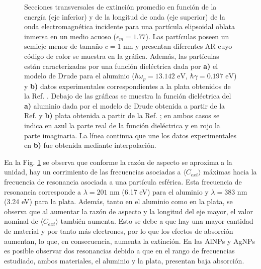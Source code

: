 \begin{figure}[h!]
	\quad%
	\caption{Secciones transversales de extinción promedio en función de la energía (eje inferior) y de la longitud de onda (eje superior) de la onda electromagnética incidente para una partícula elipsoidal oblata inmersa en un medio acuoso ($\epsilon_m=1.77$). Las partículas  poseen un semieje menor de tamaño $c=1$ nm y presentan diferentes AR cuyo código de color se muestra en la gráfica. Además, las partículas están caracterizadas por una función dieléctrica dada por  \textbf{a)} el modelo de Drude para el aluminio ($\hbar\omega_p=13.142\text{ eV}$, $\hbar\gamma=0.197\text{ eV}$) y \textbf{b)} datos experimentales correspondientes a la plata obtenidos de la Ref. \cite{Plata}. Debajo de las gráficas se muestra la función dieléctrica del \textbf{a)} aluminio dada por el modelo de Drude obtenida a partir de la Ref. \cite{Aluminio} y \textbf{b)} plata obtenida a partir de la Ref. \cite{Plata}; en ambos casos se indica en azul la parte real de la función dieléctrica y en rojo la parte imaginaria. La línea continua que une los datos experimentales en \textbf{b)} fue obtenida mediante interpolación.} \label{aluminioplatacc}
\end{figure} 

 En la Fig. \ref{aluminioplatacc} se observa que conforme la razón de aspecto se aproxima a la unidad, hay un corrimiento de las frecuencias asociadas a $\langle C_{ext}\rangle$ máximas hacia la frecuencia de resonancia asociada a una partícula esférica. Esta frecuencia de resonancia corresponde a $\lambda=201\text{ nm}$ (6.17 eV) para el aluminio y $\lambda=383\text{ nm}$ (3.24 eV) para la plata. Además, tanto en el aluminio como en la plata, se observa que al aumentar la razón de aspecto y la longitud del eje mayor, el valor nominal de  $\langle C_{ext}\rangle$ también aumenta. Esto se debe a que hay una mayor cantidad de material y por tanto más electrones, por lo que los efectos de absorción aumentan, lo que, en consecuencia, aumenta la extinción. En las AlNPs y AgNPs es posible observar dos resonancias debido a que en el rango de frecuencias estudiado, ambos materiales, el aluminio y la plata, presentan baja absorción.




